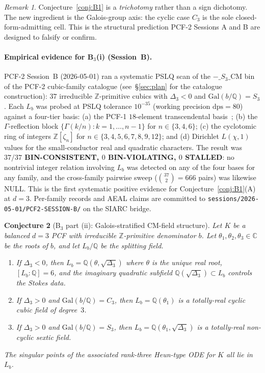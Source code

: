 \documentclass[11pt,a4paper]{article}
\newtheorem{conjecture}{Conjecture}
\theoremstyle{definition}
\theoremstyle{remark}
\newtheorem{remark}[conjecture]{Remark}
\newcommand{\Q}{\mathbb{Q}}
\newcommand{\Z}{\mathbb{Z}}
\newcommand{\C}{\mathbb{C}}
\newcommand{\Gal}{\mathrm{Gal}}
\begin{document}
\begin{remark}\label{rem:trichotomy}
Conjecture~\ref{conj:B1} is a \emph{trichotomy} rather than a sign
dichotomy. The new ingredient is the Galois-group axis: the cyclic case
$C_{3}$ is the sole closed-form-admitting cell. This is the structural
prediction PCF-2 Sessions A and B are designed to falsify or confirm.
\end{remark}

\paragraph{Empirical evidence for B$_3$(i) (Session~B).}
PCF-2 Session~B (2026-05-01) ran a systematic PSLQ scan of the
$-\_S_3\_\mathrm{CM}$ bin of the PCF-2 cubic-family catalogue
(see~\S\ref{sec:plan} for the catalogue construction): $37$ irreducible
$\Z$-primitive cubics with $\Delta_3<0$ and $\Gal(b/\Q)=S_3$. Each
$L_b$ was probed at PSLQ tolerance $10^{-35}$ (working precision
$\mathrm{dps}=80$) against a four-tier basis: (a) the PCF-1
$18$-element transcendental basis~\cite{Papanokechi2026PCF1}; (b) the
$\Gamma$-reflection block $\{\Gamma(k/n):k=1,\dots,n-1\}$ for
$n\in\{3,4,6\}$; (c) the cyclotomic ring of integers
$\Z[\zeta_n]$ for $n\in\{3,4,5,6,7,8,9,12\}$; and (d) Dirichlet
$L(\chi,1)$ values for the small-conductor real and quadratic
characters. The result was \textbf{$37/37$ BIN-CONSISTENT,
$0$ BIN-VIOLATING, $0$ STALLED}: no nontrivial integer relation
involving $L_b$ was detected on any of the four bases for any family,
and the cross-family pairwise sweep
($\binom{37}{2}=666$ pairs) was likewise NULL. This is the first
systematic positive evidence for Conjecture~\ref{conj:B1}(A) at
$d=3$. Per-family records and AEAL claims are committed to
\texttt{sessions/2026-05-01/PCF2-SESSION-B/} on the SIARC bridge.

\begin{conjecture}[B$_{3}$ part (ii): Galois-stratified CM-field structure]\label{conj:B2}
Let $K$ be a balanced $d=3$ PCF with irreducible $\Z$-primitive
denominator $b$. Let $\theta_{1},\theta_{2},\theta_{3}\in\C$ be the roots
of $b$, and let $L_{b}/\Q$ be the splitting field.
\begin{enumerate}
\item If $\Delta_{3}<0$, then $L_{b}=\Q(\theta,\sqrt{\Delta_{3}})$ where
$\theta$ is the unique real root, $[L_{b}:\Q]=6$, and the imaginary
quadratic subfield $\Q(\sqrt{\Delta_{3}})\subset L_{b}$ controls the
Stokes data.
\item If $\Delta_{3}>0$ and $\Gal(b/\Q)=C_{3}$, then $L_{b}=\Q(\theta_{1})$
is a totally-real cyclic cubic field of degree~$3$.
\item If $\Delta_{3}>0$ and $\Gal(b/\Q)=S_{3}$, then $L_{b}=\Q(\theta_{1},\sqrt{\Delta_{3}})$
is a totally-real non-cyclic sextic field.
\end{enumerate}
The singular points of the associated rank-three Heun-type ODE for $K$
all lie in $L_{b}$.
\end{conjecture}
\end{document}
